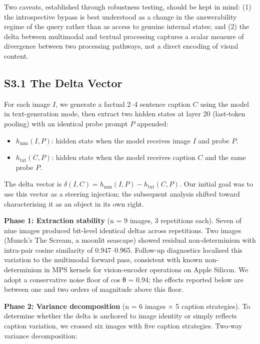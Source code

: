 \documentclass[11pt,a4paper]{article}
\providecommand{\tightlist}{\setlength{\itemsep}{0pt}\setlength{\parskip}{0pt}}
\begin{document}
Two caveats, established through robustness testing, should be kept in mind: (1) the introspective bypass is best understood as a change in the answerability regime of the query rather than as access to genuine internal states; and (2) the delta between multimodal and textual processing captures a scalar measure of divergence between two processing pathways, not a direct encoding of visual content.

\subsection*{S3.1 The Delta Vector}

For each image \(I\), we generate a factual 2--4 sentence caption \(C\) using the model in text-generation mode, then extract two hidden states at layer 20 (last-token pooling) with an identical probe prompt \(P\) appended:

\begin{itemize}
\tightlist
\item
  \(h_{\text{mm}}(I, P)\): hidden state when the model receives image \(I\) and probe \(P\).
\item
  \(h_{\text{txt}}(C, P)\): hidden state when the model receives caption \(C\) and the same probe \(P\).
\end{itemize}

The delta vector is \(\delta(I, C) = h_{\text{mm}}(I, P) - h_{\text{txt}}(C, P)\). Our initial goal was to use this vector as a steering injection; the subsequent analysis shifted toward characterising it as an object in its own right.

\textbf{Phase 1: Extraction stability} (n = 9 images, 3 repetitions each). Seven of nine images produced bit-level identical deltas across repetitions. Two images (Munch's The Scream, a moonlit seascape) showed residual non-determinism with intra-pair cosine similarity of 0.947--0.965. Follow-up diagnostics localised this variation to the multimodal forward pass, consistent with known non-determinism in MPS kernels for vision-encoder operations on Apple Silicon. We adopt a conservative noise floor of cos θ = 0.94; the effects reported below are between one and two orders of magnitude above this floor.

\textbf{Phase 2: Variance decomposition} (n = 6 images × 5 caption strategies). To determine whether the delta is anchored to image identity or simply reflects caption variation, we crossed six images with five caption strategies. Two-way variance decomposition:
\end{document}
